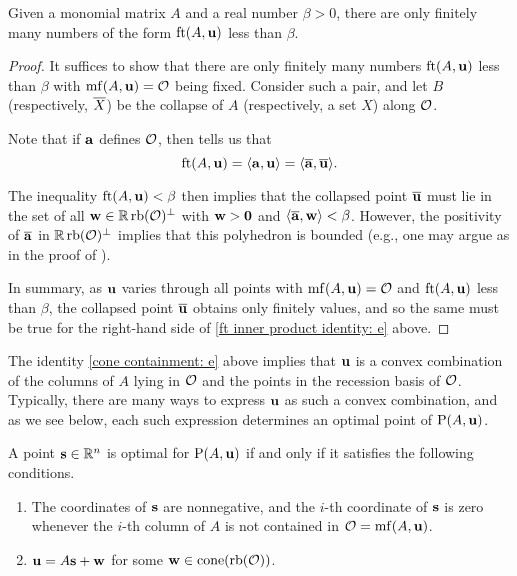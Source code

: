 \documentclass[11pt]{amsart}
\begin{document}
\begin{lemma}
\label{discreteness of F-thresholds: L}
Given a monomial matrix $A$ and a real number $\beta > 0 $, there are only finitely many numbers of the form $\operatorname{ft}(A, \mathbf{u})$ less than $\beta$.    
\end{lemma}

\begin{proof}   
It suffices to show that there are only finitely many numbers $\operatorname{ft}(A, \mathbf{u})$ less than $\beta$ with $\operatorname{mf}(A, \mathbf{u}) = \mathcal{O}$ being fixed.   Consider such a pair, and let $B$ (respectively, $\overline{X}$) be the collapse of $A$ (respectively,  a set $X$) along $\mathcal{O}$.

Note that if $\mathbf{a}$ defines $\mathcal{O}$, then  tells us that 
%
\begin{equation} 
\label{ft inner product identity: e}
\operatorname{ft}(A, \mathbf{u}) = \langle \mathbf{a}, \mathbf{u} \rangle = \langle \overline{\mathbf{a}}, \overline{\mathbf{u}} \rangle. 
\end{equation}
% 

The inequality $\operatorname{ft}(A, \mathbf{u}) < \beta$ then implies that the collapsed point $\overline{\mathbf{u}}$ must lie in the set of all $\mathbf{w} \in \mathbb{R} \operatorname{rb}(\mathcal{O})^{\perp}$ with $\mathbf{w} > \mathbf{0}$ and $\langle \overline{\mathbf{a}}, \mathbf{w} \rangle < \beta$.  However, the positivity of $\overline{\mathbf{a}}$ in $\mathbb{R} \operatorname{rb}(\mathcal{O})^{\perp}$ implies that this polyhedron is bounded (e.g., one may argue as in the proof of ).  

In summary, as $\mathbf{u}$ varies through all points with  $\operatorname{mf}(A, \mathbf{u}) = \mathcal{O}$ and $\operatorname{ft}(A, \mathbf{u})$ less than $\beta$, the collapsed point $\overline{\mathbf{u}}$ obtains only finitely values, and so the same must be true for the right-hand side of \eqref{ft inner product identity: e} above.
\end{proof}


The identity \eqref{cone containment: e} above implies that 
$\mathbf{u}$ is a convex combination of the columns of $A$ lying in $\mathcal{O}$ and the points in the recession basis of $\mathcal{O}$.  Typically, there are many ways to express $\mathbf{u}$ as such a convex combination, and as we see below, each such expression determines an optimal point of $\mathrm{P}(A, \mathbf{u})$.

\begin{corollary}  
\label{opt set: C}
A point $\mathbf{s} \in \mathbb{R}^n$ is optimal for $\mathrm{P}(A, \mathbf{u})$ if and only if it satisfies the following conditions.
\begin{enumerate}
\item  \label{mc coords: e} The coordinates of $\mathbf{s}$ are nonnegative, and the $i$-th coordinate of $\mathbf{s}$ is zero whenever the $i$-th column of $A$ is not contained in $\mathcal{O} = \operatorname{mf}(A, \mathbf{u})$.
\item  \label{mc decomposition: e} $\mathbf{u} = A \mathbf{s} + \mathbf{w}$ for some $\mathbf{w} \in  \operatorname{cone}(\operatorname{rb}(\mathcal{O}))$.   
\end{enumerate}
\end{corollary}
\end{document}
